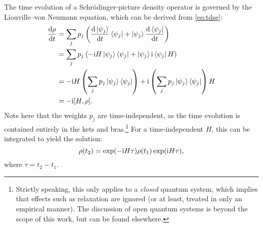 The time evolution of a Schr\"odinger-picture density operator is governed by the Liouville--von Neumann equation, which can be derived from \cref{eq:tdse}:
\begin{align}
    \label{eq:lvn}
    \frac{\mathrm{d}\rho}{\mathrm{d}t} &= \sum_j p_j \left(\frac{\mathrm{d}\ket{\psi_j}}{\mathrm{d}t}\bra{\psi_j} + \ket{\psi_j}\frac{\mathrm{d}\bra{\psi_j}}{\mathrm{d}t} \right) \notag \\
                                       &= \sum_j p_j \left(-\mathrm{i} H\ket{\psi_j}\bra{\psi_j} + \ket{\psi_j}\mathrm{i}\bra{\psi_j}H \right) \notag \\
                                       &= -\mathrm{i} H \left(\sum_j p_j\ket{\psi_j}\bra{\psi_j}\right) + \mathrm{i} \left(\sum_j p_j \ket{\psi_j}\bra{\psi_j}\right) H \notag \\
                                       &= -\mathrm{i} [H, \rho].
\end{align}
Note here that the weights $p_j$ are time-independent, as the time evolution is contained entirely in the kets and bras.\footnote{Strictly speaking, this only applies to a \textit{closed} quantum system, which implies that effects such as relaxation are ignored (or at least, treated in only an empirical manner). The discussion of open quantum systems is beyond the scope of this work, but can be found elsewhere.\autocite{Breuer2002,Lidar2019arXiv}}
For a time-independent $H$, this can be integrated to yield the solution:
\begin{equation}
    \label{eq:lvn_integrated}
    \rho(t_2) = \exp(-\mathrm{i} H\tau)\rho(t_1)\exp(\mathrm{i} H\tau),
\end{equation}
where $\tau = t_2 - t_1$.

